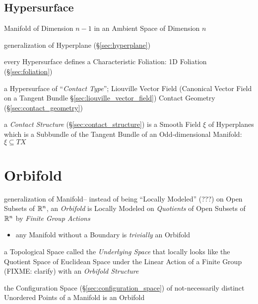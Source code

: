 \subsection{Hypersurface}\label{sec:hypersurface}


Manifold of Dimension $n-1$ in an Ambient Space of Dimension $n$

generalization of Hyperplane (\S\ref{sec:hyperplane})

every Hypersurface defines a Characteristic Foliation: 1D Foliation
(\S\ref{sec:foliation})

a Hypersurface of ``\emph{Contact Type}''; Liouville Vector Field (Canonical
Vector Field on a Tangent Bundle \S\ref{sec:liouville_vector_field}) \fist
Contact Geometry (\S\ref{sec:contact_geometry})

a \emph{Contact Structure} (\S\ref{sec:contact_structure}) is a Smooth Field
$\xi$ of Hyperplanes which is a Subbundle of the Tangent Bundle of an
Odd-dimensional Manifold: $\xi \subseteq T X$




\section{Orbifold}\label{sec:orbifold}

generalization of Manifold--
instead of being ``Locally Modeled'' (???) on Open Subsets of $\mathbb{R}^n$, an
\emph{Orbifold} is Locally Modeled on \emph{Quotients} of Open Subsets of
$\mathbb{R}^n$ by \emph{Finite Group Actions}

\begin{itemize}
  \item any Manifold without a Boundary is \emph{trivially} an Orbifold
\end{itemize}

a Topological Space called the \emph{Underlying Space} that locally looks like
the Quotient Space of Euclidean Space under the Linear Action of a Finite Group
(FIXME: clarify) with an \emph{Orbifold Structure}

the Configuration Space (\S\ref{sec:configuration_space}) of not-necessarily
distinct Unordered Points of a Manifold is an Orbifold



